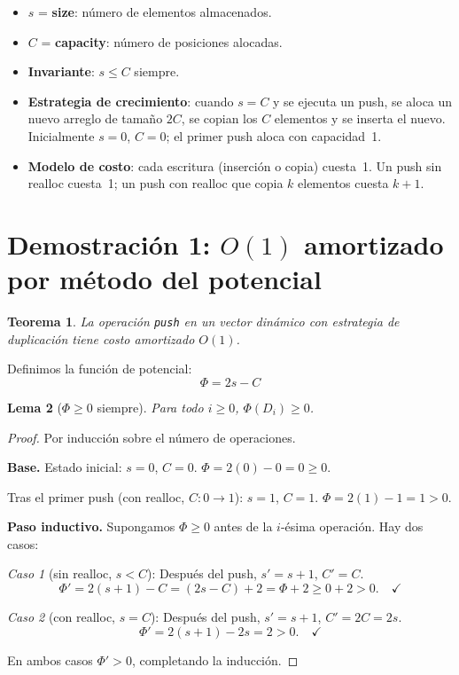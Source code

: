 \documentclass[11pt, letterpaper]{article}
\theoremstyle{definition}
\theoremstyle{plain}
\newtheorem{theorem}{Teorema}[section]
\newtheorem{lemma}[theorem]{Lema}
\theoremstyle{remark}
\begin{document}
\begin{itemize}
  \item $s$ = \textbf{size}: número de elementos almacenados.
  \item $C$ = \textbf{capacity}: número de posiciones alocadas.
  \item \textbf{Invariante}: $s \leq C$ siempre.
  \item \textbf{Estrategia de crecimiento}: cuando $s = C$ y se ejecuta
    un push, se aloca un nuevo arreglo de tamaño $2C$, se copian los
    $C$ elementos y se inserta el nuevo. Inicialmente $s = 0$, $C = 0$;
    el primer push aloca con capacidad~1.
  \item \textbf{Modelo de costo}: cada escritura (inserción o copia)
    cuesta~1. Un push sin realloc cuesta~1; un push con realloc que
    copia $k$ elementos cuesta $k + 1$.
\end{itemize}

\section{Demostración 1: \texorpdfstring{$O(1)$}{O(1)} amortizado
  por método del potencial}

\begin{theorem}\label{thm:potential}
La operación \texttt{push} en un vector dinámico con estrategia de
duplicación tiene costo amortizado $O(1)$.
\end{theorem}

Definimos la función de potencial:
\begin{equation}\label{eq:phi}
  \Phi = 2s - C
\end{equation}

\begin{lemma}[$\Phi \geq 0$ siempre]\label{lem:phi-nonneg}
Para todo $i \geq 0$, $\Phi(D_i) \geq 0$.
\end{lemma}

\begin{proof}
Por inducción sobre el número de operaciones.

\textbf{Base.} Estado inicial: $s = 0$, $C = 0$.
$\Phi = 2(0) - 0 = 0 \geq 0$. \checkmark

Tras el primer push (con realloc, $C: 0 \to 1$): $s = 1$, $C = 1$.
$\Phi = 2(1) - 1 = 1 > 0$. \checkmark

\textbf{Paso inductivo.} Supongamos $\Phi \geq 0$ antes de la
$i$-ésima operación. Hay dos casos:

\emph{Caso 1} (sin realloc, $s < C$): Después del push, $s' = s + 1$,
$C' = C$.
\[
  \Phi' = 2(s+1) - C = (2s - C) + 2 = \Phi + 2 \geq 0 + 2 > 0. \quad \checkmark
\]

\emph{Caso 2} (con realloc, $s = C$): Después del push, $s' = s + 1$,
$C' = 2C = 2s$.
\[
  \Phi' = 2(s+1) - 2s = 2 > 0. \quad \checkmark
\]

En ambos casos $\Phi' > 0$, completando la inducción.
\end{proof}
\end{document}
